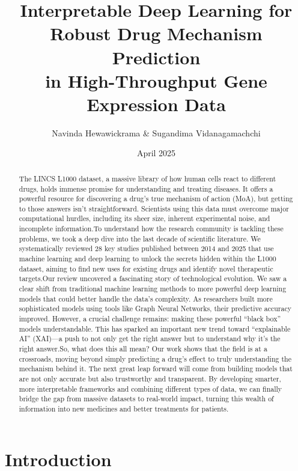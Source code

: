 \documentclass[twocolumn]{article}
\title{Interpretable Deep Learning for Robust Drug Mechanism Prediction \\ in High-Throughput Gene Expression Data}
\author{Navinda Hewawickrama \& Sugandima Vidanagamachchi}
\date{April 2025}
\begin{document}
\onecolumn
\maketitle
\begin{abstract}
        The LINCS L1000 dataset, a massive library of how human cells react to different drugs, holds immense promise for understanding and treating diseases. It offers a powerful resource for discovering a drug's true mechanism of action (MoA), but getting to those answers isn't straightforward. Scientists using this data must overcome major computational hurdles, including its sheer size, inherent experimental noise, and incomplete information.To understand how the research community is tackling these problems, we took a deep dive into the last decade of scientific literature. We systematically reviewed 28 key studies published between 2014 and 2025 that use machine learning and deep learning to unlock the secrets hidden within the L1000 dataset, aiming to find new uses for existing drugs and identify novel therapeutic targets.Our review uncovered a fascinating story of technological evolution. We saw a clear shift from traditional machine learning methods to more powerful deep learning models that could better handle the data's complexity. As researchers built more sophisticated models using tools like Graph Neural Networks, their predictive accuracy improved. However, a crucial challenge remains: making these powerful \enquote{black box} models understandable. This has sparked an important new trend toward \enquote{explainable AI} (XAI)—a push to not only get the right answer but to understand why it's the right answer.So, what does this all mean? Our work shows that the field is at a crossroads, moving beyond simply predicting a drug's effect to truly understanding the mechanism behind it. The next great leap forward will come from building models that are not only accurate but also trustworthy and transparent. By developing smarter, more interpretable frameworks and combining different types of data, we can finally bridge the gap from massive datasets to real-world impact, turning this wealth of information into new medicines and better treatments for patients.
\end{abstract}

\twocolumn
\section{Introduction}
\end{document}
